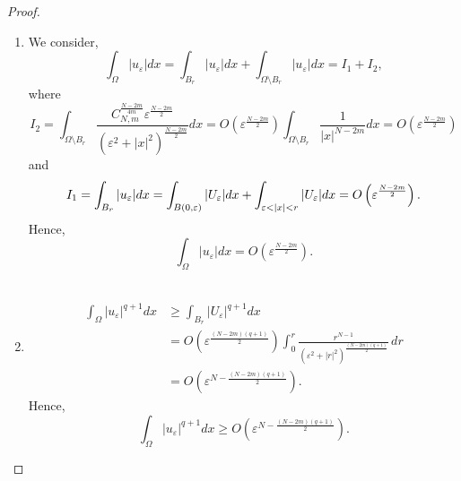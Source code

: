 \documentclass[reqno]{amsart}
\newcommand{\eps}{\varepsilon}
\newcommand{\Om}{\Omega}
\newcommand{\al} {\alpha}
\newcommand{\noi} {  \noindent}
\newcommand{\mb} {\mathbb}
\numberwithin{theorem}{section} \numberwithin{equation}{section}
\begin{document}
\begin{proof}
\begin{enumerate}
Similarly, we obtain
\begin{equation}\label{e48}
\mathrm{A_3} \leq  O\left(\eps^{2N-\al}\right)
\int_{\mb{R}^N \setminus B_r} \int_{\mb{R}^N \setminus B_r}\frac{1}{\left(\eps^2 + |x|^2\right)^{\frac{(2N-\al)}{2}}|x-y|^\al\left(\eps^2 + |y|^2\right)^{\frac{2N-\al}{2}}}\, dx \, dy \quad \leq O\left(\eps^{2N-\al}\right).
\end{equation}
It follows from \eqref{e45}- \eqref{e48} that
\begin{equation}\label{e52}
\int_{\Om} \int_{\Om} \frac{\left|u_{\eps}(x)\right|^{2_{\al, m}^*}\left|u_{\eps}(y)\right|^{2_{\al, m}^*}}{|x-y|^\al}\, dx \, dy \geq C(N, \al)^{\frac{N}{2m}} S_{H, L}^{\frac{2N-\al}{2m}}-O\left(\eps^{\frac{2N-\al}{2}}\right).
\end{equation}\\ 
\item
We consider,
\[\int_\Om|u_\eps|dx=\int_{B_r}|u_\eps|dx+\int_{\Om\setminus B_r}|u_\eps|dx=I_1+I_2,\]
where
\[I_2=\int_{\Om\setminus B_r} \frac{C^\frac{N-2m}{4m}_{N, m}{\eps^\frac{N-2m}{2}}}{(\eps^2+|x|^2)^\frac{N-2m}{2}}dx= O\left({\eps^\frac{N-2m}{2}}\right)\int_{\Om\setminus B_r}\frac{1}{|x|^{N-2m}}dx=O\left({\eps^\frac{N-2m}{2}}\right)\]
and
\noi \[I_1=\int_{B_r}|u_\eps|dx\\
=\int_{B(0,\eps)}|U_\eps|dx+\int_{\eps<|x|<r}|U_\eps|dx= O\left({\eps^\frac{N-2m}{2}}\right).\]
Hence,
\begin{equation} \label{e53}
\int_\Om|u_\eps|dx= O\left({\eps^\frac{N-2m}{2}}\right).    
\end{equation}\\
\item
\begin{align*}
\int_\Om|u_\eps|^{q+1}dx&\geq\int_{B_r}|U_\eps|^{q+1}dx\\
&= O\left(\eps^{\frac{(N-2m)(q+1)}{2}}\right) \int_0^r \frac{r^{N-1}}{(\eps^2+|r|^2)^{\frac{(N-2m)(q+1)}{2}}} \, dr\\
&=O\left(\eps^{N-{\frac{(N-2m)(q+1)}{2}}}\right).
\end{align*} 
Hence, \[\int_\Om|u_\eps|^{q+1}dx\geq O\left(\eps^{N-{\frac{(N-2m)(q+1)}{2}}}\right).\]
\end{enumerate}
\end{proof}

\end{document}

